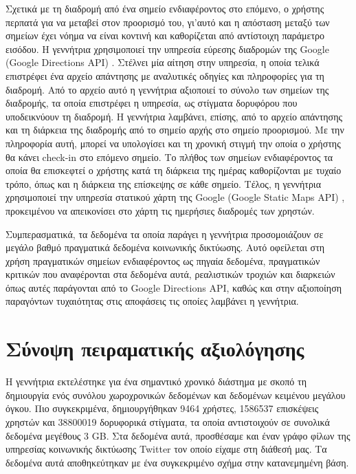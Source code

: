 Σχετικά με τη διαδρομή από ένα σημείο 
ενδιαφέροντος στο επόμενο, ο χρήστης περπατά για να μεταβεί στον προορισμό του, γι'αυτό και η απόσταση μεταξύ των σημείων έχει νόημα να είναι κοντινή και 
καθορίζεται από αντίστοιχη παράμετρο εισόδου. Η γεννήτρια χρησιμοποιεί την υπηρεσία εύρεσης διαδρομών της Google (Google Directions API) \cite{16}. 
Στέλνει μία αίτηση στην υπηρεσία, 
η οποία τελικά επιστρέφει ένα αρχείο απάντησης με αναλυτικές οδηγίες και πληροφορίες για τη διαδρομή. Από το αρχείο αυτό η γεννήτρια αξιοποιεί το σύνολο των σημείων της 
διαδρομής, τα οποία επιστρέφει η υπηρεσία, ως στίγματα δορυφόρου που υποδεικνύουν τη διαδρομή. Η γεννήτρια λαμβάνει, επίσης, από το αρχείο απάντησης και τη διάρκεια 
της διαδρομής από το σημείο αρχής στο σημείο προορισμού. Με την πληροφορία αυτή, μπορεί να υπολογίσει και τη χρονική στιγμή την οποία ο χρήστης θα κάνει check-in στο 
επόμενο σημείο. Το πλήθος των σημείων ενδιαφέροντος τα οποία θα επισκεφτεί ο χρήστης κατά τη διάρκεια της ημέρας καθορίζονται με τυχαίο τρόπο, όπως και 
η διάρκεια της επίσκεψης σε κάθε σημείο. Τέλος, η γεννήτρια χρησιμοποιεί την υπηρεσία στατικού χάρτη της Google (Google Static Maps API) \cite{18}, προκειμένου να 
απεικονίσει στο χάρτη τις ημερήσιες διαδρομές των χρηστών. 

Συμπερασματικά, τα δεδομένα τα οποία παράγει η γεννήτρια προσομοιάζουν σε μεγάλο βαθμό πραγματικά δεδομένα κοινωνικής δικτύωσης. Αυτό οφείλεται 
στη χρήση πραγματικών σημείων ενδιαφέροντος ως πηγαία δεδομένα, πραγματικών κριτικών που αναφέρονται στα δεδομένα αυτά, ρεαλιστικών τροχιών
και διαρκειών όπως αυτές παράγονται από το Google Directions API, καθώς   
και στην αξιοποίηση παραγόντων τυχαιότητας στις αποφάσεις τις οποίες λαμβάνει η γεννήτρια. 


\section{Σύνοψη πειραματικής αξιολόγησης}

Η γεννήτρια εκτελέστηκε για ένα σημαντικό χρονικό διάστημα με σκοπό τη δημιουργία ενός συνόλου χωροχρονικών δεδομένων και δεδομένων κειμένου μεγάλου όγκου. 
Πιο συγκεκριμένα, δημιουργήθηκαν 9464 χρήστες, 1586537 επισκέψεις χρηστών και 38800019 δορυφορικά στίγματα, τα οποία αντιστοιχούν σε συνολικά δεδομένα μεγέθους 3 GB. 
Στα δεδομένα αυτά, προσθέσαμε και έναν γράφο φίλων της υπηρεσίας κοινωνικής δικτύωσης Twitter τον οποίο είχαμε στη διάθεσή μας. 
Τα δεδομένα αυτά αποθηκεύτηκαν με ένα συγκεκριμένο σχήμα στην κατανεμημένη βάση. 

